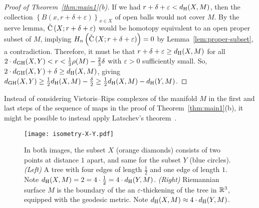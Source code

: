 \documentclass[11pt, reqno, english]{amsart}
\begin{document}
\begin{proof}[Proof of Theorem~\ref{thm:main1}(b)]
If we had $r+\delta+\varepsilon < d_{\mathrm{H}}(X,M)$, then the collection $\left\{B\left(x,r+\delta+\varepsilon\right)\right\}_{x\in X}$ of open balls would not cover $M$.
By the nerve lemma, $\mathrm{\check{C}}\left(X;r+\delta+\varepsilon\right)$ would be homotopy equivalent to an open proper subset of $M$, implying $H_n\left(\mathrm{\check{C}}\left(X;r+\delta+\varepsilon\right)\right)=0$ by Lemma~\ref{lem:proper-subset}, a contradiction.
Therefore, it must be that $r+\delta+\varepsilon \ge d_{\mathrm{H}}(X,M)$ for all $2\cdot d_{\mathrm{GH}}(X,Y) < r < \frac{1}{3}\rho(M)-\frac{2}{3}\delta$ with $\varepsilon>0$ sufficiently small.
So, $2 \cdot d_{\mathrm{GH}}(X,Y)+\delta \ge d_{\mathrm{H}}(X,M)$, giving $d_{\mathrm{GH}}(X,Y) \ge \frac{1}{2}d_{\mathrm{H}}(X,M)-\frac{\delta}{2} \ge \frac{1}{2}d_{\mathrm{H}}(X,M)-d_{\mathrm{H}}(Y,M)$.
\end{proof}

Instead of considering Vietoris--Rips complexes of the manifold $M$ in the first and last steps of the sequence of maps in the proof of Theorem~\ref{thm:main1}(b), it might be possible to instead apply Latschev's theorem~\cite{Latschev2001,lemevz2022finite,majhi2023demystifying}.

\begin{figure}[htb]
\centering
\texttt{[image: isometry-X-Y.pdf]}
\caption{
In both images, the subset $X$ (orange diamonds) consists of two points at distance $1$ apart, and same for the subset $Y$ (blue circles).
\emph{(Left)} A tree with four edges of length $\frac{1}{2}$ and one edge of length $1$.
Note $d_{\mathrm{H}}(X,M)=2=4\cdot\frac{1}{2}=4\cdot d_{\mathrm{H}}(Y,M)$.
\emph{(Right)} Riemannian surface $M$ is the boundary of the an $\varepsilon$-thickening of the tree in $\mathbb{R}^3$, equipped with the geodesic metric.
Note $d_{\mathrm{H}}(X,M)\approx 4\cdot d_{\mathrm{H}}(Y,M)$.
}
\label{fig:isometry-X-Y}
\end{figure}
\end{document}
